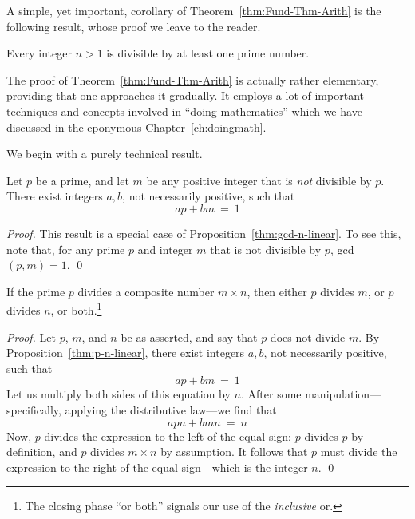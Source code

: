 A simple, yet important, corollary of Theorem~\ref{thm:Fund-Thm-Arith} is the following result, whose proof we leave to the reader.

\begin{prop}
\label{thm:prime-divisor}
Every integer $n>1$ is divisible by at least one prime number.
\end{prop}

\medskip

The proof of Theorem~\ref{thm:Fund-Thm-Arith} is actually rather elementary, providing that one approaches it gradually.  It employs a lot of important techniques and concepts involved in ``doing mathematics'' which we have discussed in the eponymous Chapter~\ref{ch:doingmath}.

\medskip

We begin with a purely technical result.

\begin{prop}
\label{thm:p-n-linear}
Let $p$ be a prime, and let $m$ be any positive integer that is {\em not} divisible by $p$.  There exist integers $a, b$, not necessarily positive, such that
\[ ap + bm \ = \ 1 \]
\end{prop}

\begin{proof}
This result is a special case of Proposition~\ref{thm:gcd-n-linear}.   To see this, note that, for any prime $p$ and integer $m$ that is not divisible by $p$,  {\sc gcd}$(p, m) = 1$.  \qed
\end{proof}

\begin{prop}
\label{thm:p-divides-onefactor}
If the prime $p$ divides a composite number $m \times n$, then either $p$ divides $m$, or $p$ divides $n$, or both.\footnote{The closing phase ``or both'' signals our use of the {\em inclusive} or.}
\end{prop}

\begin{proof}
Let $p$, $m$, and $n$ be as asserted, and say that $p$ does not divide $m$.  By Proposition~\ref{thm:p-n-linear}, there exist integers $a, b$, not necessarily positive, such that
\[ ap + bm \ = \ 1 \]
Let us multiply both sides of this equation by $n$.  After some manipulation---specifically, applying the distributive law---we find that
\[ apn + bmn \ = \ n \]
Now, $p$ divides the expression to the left of the equal sign: $p$ divides $p$ by definition, and $p$ divides $m \times n$ by assumption.  It follows that $p$ must divide the expression to the right of the equal sign---which is the integer $n$.  \qed
\end{proof}

